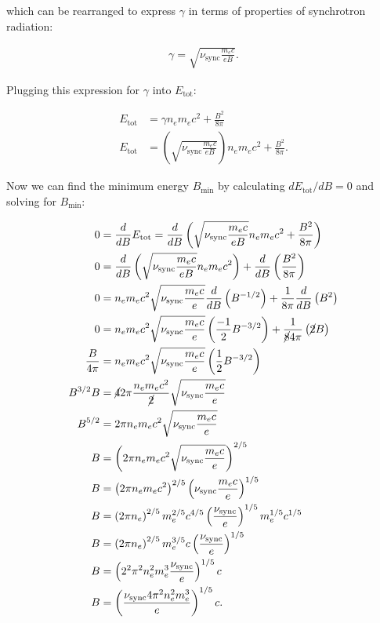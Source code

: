 \documentclass[12pt]{article}
\begin{document}
{\noindent}which can be rearranged to express $\gamma$ in terms of properties of synchrotron radiation:

\begin{align*}
    \gamma = \sqrt{\nu_\mathrm{sync} \frac{m_ec}{eB}}.
\end{align*}

{\noindent}Plugging this expression for $\gamma$ into $E_\mathrm{tot}$:

\begin{equation*}
\begin{split}
    E_\mathrm{tot} &= \gamma n_e m_ec^2 + \frac{B^2}{8\pi} \\
    E_\mathrm{tot} &= \left(\sqrt{\nu_\mathrm{sync} \frac{m_ec}{eB}}\right) n_e m_ec^2 + \frac{B^2}{8\pi}.
\end{split}
\end{equation*}

{\noindent}Now we can find the minimum energy $B_\mathrm{min}$ by calculating $dE_\mathrm{tot}/dB = 0$ and solving for $B_\mathrm{min}$:

\begin{equation*}
\begin{split}
    0 &= \frac{d}{dB}E_\mathrm{tot} = \frac{d}{dB} \left( \sqrt{\nu_\mathrm{sync} \frac{m_ec}{eB}} n_e m_ec^2 + \frac{B^2}{8\pi} \right) \\
    0 &= \frac{d}{dB} \left( \sqrt{\nu_\mathrm{sync} \frac{m_ec}{eB}} n_e m_ec^2 \right) + \frac{d}{dB} \left( \frac{B^2}{8\pi} \right) \\
    0 &= n_e m_ec^2 \sqrt{\nu_\mathrm{sync} \frac{m_ec}{e}} \frac{d}{dB} \left( B^{-1/2} \right) + \frac{1}{8\pi}\frac{d}{dB} \left( B^2 \right) \\
    0 &= n_e m_ec^2 \sqrt{\nu_\mathrm{sync} \frac{m_ec}{e}} \left( \frac{-1}{2}B^{-3/2} \right) + \frac{1}{\cancel{8}4\pi}\left( \cancel{2}B \right) \\
    \frac{B}{4\pi} &= n_e m_ec^2 \sqrt{\nu_\mathrm{sync} \frac{m_ec}{e}} \left( \frac{1}{2}B^{-3/2} \right) \\
    B^{3/2}B &= \cancel{4}2\pi\frac{n_e m_ec^2}{\cancel{2}} \sqrt{\nu_\mathrm{sync} \frac{m_ec}{e}} \\
    B^{5/2} &= 2\pi n_e m_ec^2 \sqrt{\nu_\mathrm{sync} \frac{m_ec}{e}} \\
    B &= \left(2\pi n_e m_ec^2\sqrt{\nu_\mathrm{sync}\frac{m_ec}{e}} \right)^{2/5} \\
    B &= \left(2\pi n_em_ec^2\right)^{2/5} \left(\nu_\mathrm{sync}\frac{m_ec}{e}\right)^{1/5} \\
    B &= \left(2\pi n_e\right)^{2/5} m_e^{2/5}c^{4/5} \left(\frac{\nu_\mathrm{sync}}{e}\right)^{1/5} m_e^{1/5}c^{1/5} \\
    B &= \left(2\pi n_e\right)^{2/5} m_e^{3/5}c \left(\frac{\nu_\mathrm{sync}}{e}\right)^{1/5} \\
    B &= \left(2^2\pi^2 n_e^2 m_e^3 \frac{\nu_\mathrm{sync}}{e}\right)^{1/5} c \\
    B &= \left(\frac{\nu_\mathrm{sync}4\pi^2 n_e^2 m_e^3}{e}\right)^{1/5} c.
\end{split}
\end{equation*}
\end{document}
